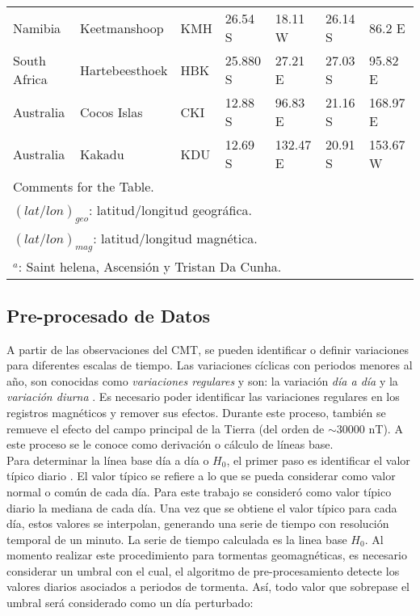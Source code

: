 \documentclass[preprint,12pt]{article}
\begin{document}
\begin{table}[htbp]
\begin{tabular}{lllllll}
		Namibia & Keetmanshoop & KMH & 26.54 S & 18.11 W & 26.14 S & 86.2 E \\ 
		South Africa & Hartebeesthoek & HBK & 25.880 S & 27.21 E & 27.03 S & 95.82 E \\ 
		Australia & Cocos Islas & CKI & 12.88 S & 96.83 E  & 21.16 S & 168.97 E \\ 
		Australia & Kakadu & KDU & 12.69 S & 132.47 E & 20.91 S & 153.67 W \\ \hline
		\multicolumn{7}{l}{Comments for the Table.} \\
		\multicolumn{7}{l}{$(lat/lon)_{geo}$: latitud/longitud geográfica.}\\
		\multicolumn{7}{l}{$(lat/lon)_{mag}$: latitud/longitud magnética.} \\
		\multicolumn{7}{l}{$^a$: Saint helena, Ascensión y Tristan Da Cunha.} 	
	\end{tabular}
	\label{tab:2}
\end{table}



\subsection{Pre-procesado de Datos}
\label{SS:2-2}

A partir de las observaciones del CMT, se pueden identificar o definir variaciones para diferentes escalas de tiempo. Las variaciones cíclicas con periodos menores al año, son conocidas como \emph{variaciones regulares} y son: la variación \emph{día a día} y la \emph{variación diurna} \cite{l_handbook_geof_sw_Geom_field, baseline_Gjerloev, vanKampt}. Es necesario poder identificar las variaciones regulares en los registros magnéticos y remover sus efectos. Durante este proceso, también se remueve el efecto del campo principal de la Tierra (del orden de $\sim 30 000$ nT). A este proceso se le conoce como derivación o cálculo de líneas base.\\

Para determinar la línea base día a día o $H_0$,  el primer paso es identificar el valor típico diario \cite{baseline_Gjerloev}. El valor típico se refiere a lo que se pueda considerar como valor normal o común de cada día. Para este trabajo se consideró como valor típico diario la mediana de cada día. Una vez que se obtiene el valor típico para cada día, estos valores se interpolan, generando una serie de tiempo con resolución temporal de un minuto. La serie de tiempo calculada es la linea base $H_0$. Al momento realizar este procedimiento para tormentas geomagnéticas, es necesario considerar un umbral con el cual, el algoritmo de pre-procesamiento detecte los valores diarios asociados a periodos de tormenta. Así, todo valor que sobrepase el umbral será considerado como un día perturbado:
\end{document}
